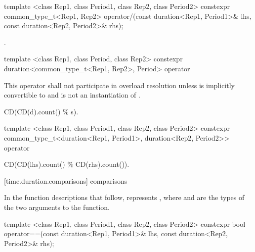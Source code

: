 %
%
\begin{itemdecl}
template <class Rep1, class Period1, class Rep2, class Period2>
  constexpr common_type_t<Rep1, Rep2>
  operator/(const duration<Rep1, Period1>& lhs, const duration<Rep2, Period2>& rhs);
\end{itemdecl}

\begin{itemdescr}
\pnum
\returns {}.
\end{itemdescr}

%
%
\begin{itemdecl}
template <class Rep1, class Period, class Rep2>
  constexpr duration<common_type_t<Rep1, Rep2>, Period>
  operator%
\end{itemdecl}

\begin{itemdescr}
\pnum
\remarks This operator shall not participate in overload
resolution unless  is implicitly convertible to  and
 is not an instantiation of .

\pnum
\returns CD(CD(d).count() \% s).
\end{itemdescr}

%
%
\begin{itemdecl}
template <class Rep1, class Period1, class Rep2, class Period2>
  constexpr common_type_t<duration<Rep1, Period1>, duration<Rep2, Period2>>
  operator%
\end{itemdecl}

\begin{itemdescr}
\pnum
\returns CD(CD(lhs).count() \% CD(rhs).count()).
\end{itemdescr}


[time.duration.comparisons]{ comparisons}

\pnum
In the function descriptions that follow,  represents
, where  and  are the types of
the two arguments to the function.

%
%
\begin{itemdecl}
template <class Rep1, class Period1, class Rep2, class Period2>
  constexpr bool operator==(const duration<Rep1, Period1>& lhs, const duration<Rep2, Period2>& rhs);
\end{itemdecl}

